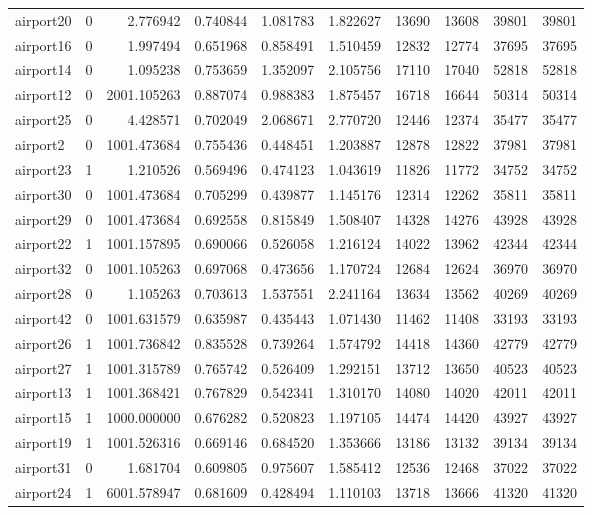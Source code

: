 \begin{longtable}{|l|r|r|r|r|r|r|r|r|r|}
airport20 & 0 & 2.776942 & 0.740844 & 1.081783 & 1.822627 & 13690 & 13608 & 39801 & 39801 \\
airport16 & 0 & 1.997494 & 0.651968 & 0.858491 & 1.510459 & 12832 & 12774 & 37695 & 37695 \\
airport14 & 0 & 1.095238 & 0.753659 & 1.352097 & 2.105756 & 17110 & 17040 & 52818 & 52818 \\
airport12 & 0 & 2001.105263 & 0.887074 & 0.988383 & 1.875457 & 16718 & 16644 & 50314 & 50314 \\
airport25 & 0 & 4.428571 & 0.702049 & 2.068671 & 2.770720 & 12446 & 12374 & 35477 & 35477 \\
airport2 & 0 & 1001.473684 & 0.755436 & 0.448451 & 1.203887 & 12878 & 12822 & 37981 & 37981 \\
airport23 & 1 & 1.210526 & 0.569496 & 0.474123 & 1.043619 & 11826 & 11772 & 34752 & 34752 \\
airport30 & 0 & 1001.473684 & 0.705299 & 0.439877 & 1.145176 & 12314 & 12262 & 35811 & 35811 \\
airport29 & 0 & 1001.473684 & 0.692558 & 0.815849 & 1.508407 & 14328 & 14276 & 43928 & 43928 \\
airport22 & 1 & 1001.157895 & 0.690066 & 0.526058 & 1.216124 & 14022 & 13962 & 42344 & 42344 \\
airport32 & 0 & 1001.105263 & 0.697068 & 0.473656 & 1.170724 & 12684 & 12624 & 36970 & 36970 \\
airport28 & 0 & 1.105263 & 0.703613 & 1.537551 & 2.241164 & 13634 & 13562 & 40269 & 40269 \\
airport42 & 0 & 1001.631579 & 0.635987 & 0.435443 & 1.071430 & 11462 & 11408 & 33193 & 33193 \\
airport26 & 1 & 1001.736842 & 0.835528 & 0.739264 & 1.574792 & 14418 & 14360 & 42779 & 42779 \\
airport27 & 1 & 1001.315789 & 0.765742 & 0.526409 & 1.292151 & 13712 & 13650 & 40523 & 40523 \\
airport13 & 1 & 1001.368421 & 0.767829 & 0.542341 & 1.310170 & 14080 & 14020 & 42011 & 42011 \\
airport15 & 1 & 1000.000000 & 0.676282 & 0.520823 & 1.197105 & 14474 & 14420 & 43927 & 43927 \\
airport19 & 1 & 1001.526316 & 0.669146 & 0.684520 & 1.353666 & 13186 & 13132 & 39134 & 39134 \\
airport31 & 0 & 1.681704 & 0.609805 & 0.975607 & 1.585412 & 12536 & 12468 & 37022 & 37022 \\
airport24 & 1 & 6001.578947 & 0.681609 & 0.428494 & 1.110103 & 13718 & 13666 & 41320 & 41320 \\

\end{longtable}
